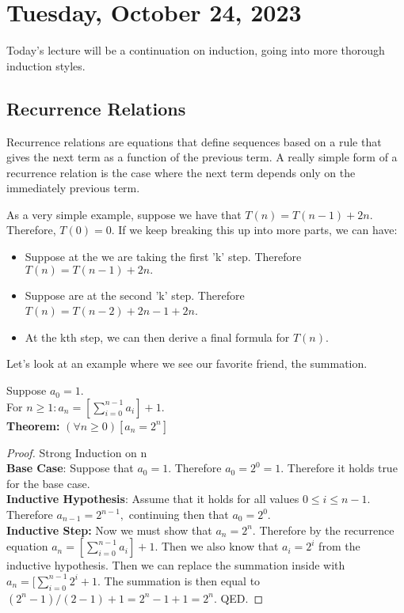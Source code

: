 \section{Tuesday, October 24, 2023}
Today's lecture will be a continuation on induction, going into more thorough induction styles.

\subsection{Recurrence Relations}
Recurrence relations are equations that define sequences based on a rule that gives the next term as a function of the previous term. A really simple form of a recurrence relation is the case where the next term depends only on the immediately previous term.

As a very simple example, suppose we have that $T(n)=T(n-1)+2n$. Therefore, $T(0)=0$. If we keep breaking this up into more parts, we can have:

\begin{itemize}
	\item Suppose at the we are taking the first 'k' step. Therefore $T(n)=T(n-1)+2n.$
	\item Suppose are at the second 'k' step. Therefore $T(n)=T(n-2)+2n-1+2n$.
	\item At the kth step, we can then derive a final formula for $T(n)$.
\end{itemize}

Let's look at an example where we see our favorite friend, the summation.

\begin{example}
	Suppose $a_0=1$.\\
	For $n \geq 1: a_n=[\sum_{i=0}^{n-1}a_i]+1$.\\
	\textbf{Theorem:} $(\forall n \geq 0)[a_n=2^n]$
\end{example}

\begin{proof}
	Strong Induction on n\\
	\textbf{Base Case}: Suppose that $a_0=1$. Therefore $a_0=2^0=1$. Therefore it holds true for the base case.\\
	\textbf{Inductive Hypothesis}: Assume that it holds for all values $0\leq i \leq n-1$. Therefore $a_{n-1}=2^{n-1},$ continuing then that $a_0=2^0$.\\
	\textbf{Inductive Step:} Now we must show that $a_n=2^n$. Therefore by the recurrence equation $a_n=[\sum_{i=0}^{n-1}a_i]+1$. Then we also know that $a_i=2^i$ from the inductive hypothesis. Then we can replace the summation inside with $a_n=[\sum_{i=0}^{n-1}2^i+1$. The summation is then equal to $(2^n-1)/(2-1)+1=2^n-1+1=2^n$. QED.
\end{proof}

